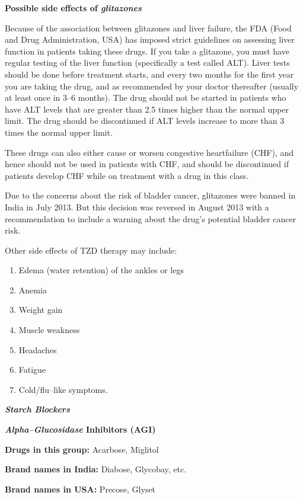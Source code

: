 \noindent\textbf{Possible side effects of \textit{glitazones}}

Because of the association between glitazones and liver failure, the FDA (Food and Drug Administration, USA) has imposed strict guidelines on assessing liver function in patients taking these drugs. If you take a glitazone, you must have regular testing of the liver function (specifically a test called ALT). Liver tests should be done before treatment starts, and every two months for the first year you are taking the drug, and as recommended by your doctor thereafter (usually at least once in 3–6 months). The drug should not be started in patients who have ALT levels that are greater than 2.5 times higher than the normal upper limit. The drug should be discontinued if ALT levels increase to more than 3 times the normal upper limit.

These drugs can also either cause or worsen congestive heart\break failure (CHF), and hence should not be used in patients with CHF, and should be discontinued if patients develop CHF while on treatment with a drug in this class.

Due to the concerns about the risk of bladder cancer, glitazones were banned in India in July 2013. But this decision was reversed in August 2013 with a recommendation to include a warning about the drug’s potential bladder cancer risk.

\noindent Other side effects of TZD therapy may include:

\begin{enumerate}[•]
\itemsep=0pt
\item Edema (water retention) of the ankles or legs
\item Anemia
\item Weight gain
\item Muscle weakness
\item Headaches
\item Fatigue
\item Cold/flu–like symptoms.
\end{enumerate}

\textbf{\textit{Starch Blockers}}

\textbf{\textit{Alpha–Glucosidase} Inhibitors (AGI)}

\textbf{Drugs in this group:} Acarbose, Miglitol

\textbf{Brand names in India:} Diabose, Glycobay, etc.

\textbf{Brand names in USA:} Precose, Glyset


